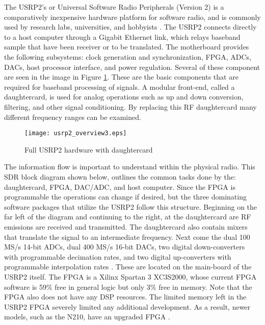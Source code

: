 The USRP2's or Universal Software Radio Peripherals (Version 2) is a comparatively inexpensive hardware platform for software radio, and is commonly used by research labs, universities, and hobbyists \cite{wired}.  The USRP2 connects directly to a host computer through a Gigabit Ethernet link, which relays baseband sample that have been receiver or to be translated.   The motherboard provides the following subsystems: clock generation and synchronization, FPGA, ADCs, DACs, host processor interface, and power regulation. Several of these component are seen in the image in Figure \ref{usrp2_full_hardware}.  These are the basic components that are required for baseband processing of signals. A modular front-end, called a daughtercard, is used for analog operations such as up and down conversion, filtering, and other signal conditioning. By replacing this RF daughtercard many different frequency ranges can be examined.\\

\begin{figure}\label{usrp2_full_hardware}
\centering
\texttt{[image: usrp2\_overview3.eps]}
\caption{Full USRP2 hardware with daughtercard}
\end{figure}



The information flow is important to understand within the physical radio.  This SDR block diagram shown below, outlines the common tasks done by the: daughtercard, FPGA, DAC/ADC, and host computer.  Since the FPGA is programmable the operations can change if desired, but the three dominating software packages that utilize the USRP2 follow this structure.  Beginning on the far left of the diagram and continuing to the right, at the daughtercard are RF emissions are received and transmitted.  The daughtercard also contain mixers that translate the signal to an intermediate frequency.  Next come the dual 100 MS/s 14-bit ADCs, dual 400 MS/s 16-bit DACs, two digital down-converters with programmable decimation rates, and two digital up-converters with programmable interpolation rates \cite{USRP2Stats}.  These are located on the main-board of the USRP2 itself.  The FPGA is a Xilinx Spartan 3 XC3S2000, whose current FPGA software is 59\% free in general logic but only 3\% free in memory.  Note that the FPGA also does not have any DSP resources.  The limited memory left in the USRP2 FPGA severely limited any additional development.  As a result, newer models, such as the N210, have an upgraded FPGA \cite{n210spec}.\\

